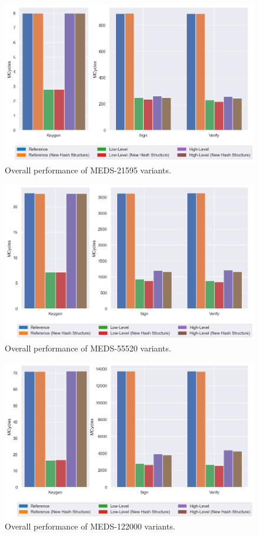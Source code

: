 \documentclass[11pt,a4paper]{report}
\theoremstyle{definition}
\begin{document}
\begin{figure}
  \centering
  \includegraphics[width=\textwidth]{plots/barplot_MEDS-21595.png}
  \caption{Overall performance of MEDS-21595 variants.}
  \label{fig:overal_performance_bar_chart_MEDS-21595}
\end{figure}

\begin{figure}
  \centering
  \includegraphics[width=\textwidth]{plots/barplot_MEDS-55520.png}
  \caption{Overall performance of MEDS-55520 variants.}
  \label{fig:overal_performance_bar_chart_MEDS-55520}
\end{figure}

\begin{figure}
  \centering
  \includegraphics[width=\textwidth]{plots/barplot_MEDS-122000.png}
  \caption{Overall performance of MEDS-122000 variants.}
  \label{fig:overal_performance_bar_chart_MEDS-122000}
\end{figure}
\end{document}
